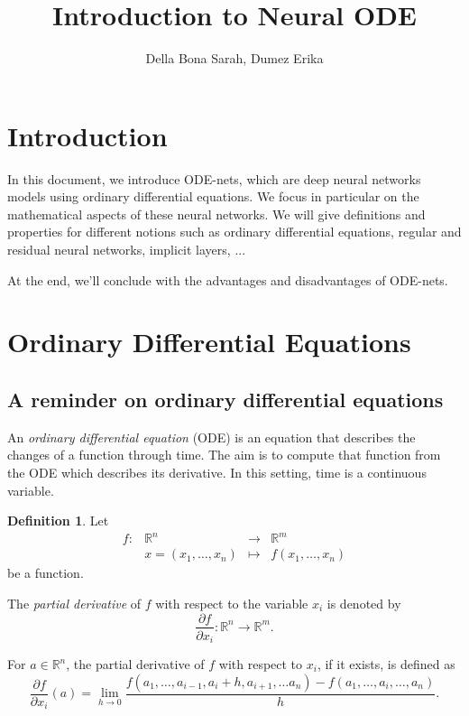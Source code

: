 \documentclass[10pt,a4paper]{article}
\author{Della Bona Sarah, Dumez Erika}
\title{Introduction to Neural ODE}
\theoremstyle{definition}
\newtheorem{definition}{Definition}
\theoremstyle{definition}
\theoremstyle{definition}
\begin{document}
\maketitle

\newpage
\tableofcontents

\newpage
\section{Introduction}

In this document, we introduce ODE-nets, which are deep neural networks models using ordinary differential equations. We focus in particular on the mathematical aspects of these neural networks. We will give definitions and properties for different notions such as ordinary differential equations, regular and residual neural networks, implicit layers, ... 

\noindent At the end, we'll conclude with the advantages and disadvantages of ODE-nets.


\section{Ordinary Differential Equations}

\subsection{A reminder on ordinary differential equations}

An\textit{ ordinary differential equation} (ODE) is an equation that describes the changes of a function through time. The aim is to compute that function from the ODE which describes its derivative. In this setting, time is a continuous variable.


\begin{definition}
Let   $$\begin{array}{rclc}
f: & \mathbb{R}^n & \rightarrow &  \mathbb{R}^m \\
&x = (x_1, \dots, x_n) & \mapsto & f(x_1, \dots, x_n)
\end{array}$$ be a function.

The \textit{partial derivative} of $f$ with respect to the variable $x_i$ is denoted by
$$
\frac{\partial f}{\partial x_i} :\mathbb{R}^n \rightarrow \mathbb{R}^m.
$$

For $a\in \mathbb{R}^n$, the partial derivative of $f$ with respect to $x_i$, if it exists, is defined as
$$
\frac{\partial f}{\partial x_i}(a) = \lim_{h\rightarrow0}\frac{f(a_1,\dots , a_{i-1}, a_i + h, a_{i+1}, \dots a_n) - f(a_1,\dots, a_i,\dots, a_n)}{h}.
$$
\end{definition}
\end{document}
